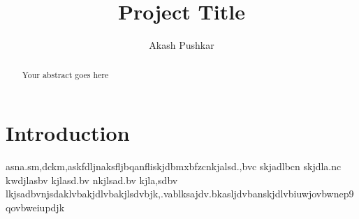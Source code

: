 \documentclass[a4paper, twoside, 11pt]{report}
\title{Project Title}
\author{Akash Pushkar}
\begin{document}


\begin{abstract}
Your abstract goes here
\end{abstract}

\tableofcontents
\listoffigures
\listoftables

\chapter{Introduction}


\newpage
asna.sm,dckm,askfdljnaksfljbqanfliskjdbmxbfzcnkjalsd.,bvc skjadlbcn skjdla.nc kwdjlasbv kjlasd.bv nkjlsad.bv kjla,sdbv lkjsadbvnjsdaklvbakjdlvbakjlsdvbjk,.vablksajdv.bkasljdvbanskjdlvbiuwjovbwnep9qovbweiupdjk



% 
% 
\end{document}
